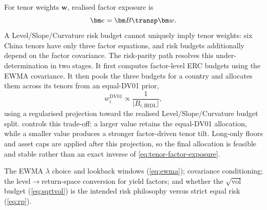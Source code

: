 For tenor weights $\bm w$, realised factor exposure is
\begin{equation}
\bm e = \bm B\transp \bm w.
\label{eq:tenor-factor-exposure}
\end{equation}
A Level/Slope/Curvature risk budget cannot uniquely imply tenor weights: six China
tenors have only three factor equations, and risk budgets additionally depend on
the factor covariance.  The risk-parity path resolves this under-determination in
two stages.  It first computes factor-level ERC budgets using the EWMA covariance.
It then pools the three budgets for a country and allocates them across its tenors
from an equal-DV01 prior,
\begin{equation}
w_i^{\mathrm{DV01}} \propto \frac{1}{\lvert B_{i,\mathrm{IRDL}}\rvert},
\label{eq:dv01-prior}
\end{equation}
using a regularised projection toward the realised Level/Slope/Curvature budget
split.   controls this trade-off: a larger value retains
the equal-DV01 allocation, while a smaller value produces a stronger factor-driven
tenor tilt.  Long-only floors and asset caps are applied after this projection, so
the final allocation is feasible and stable rather than an exact inverse of
\cref{eq:tenor-factor-exposure}.

\begin{reviewnote}
The EWMA $\lambda$ choice and lookback windows (\cref{eq:ewma}); covariance
conditioning; the level$\rightarrow$return-space conversion for yield factors; and
whether the $\sqrt{\text{vol}}$ budget (\cref{eq:sqrtvol}) is the intended risk
philosophy versus strict equal risk (\cref{eq:rp}).
\end{reviewnote}

